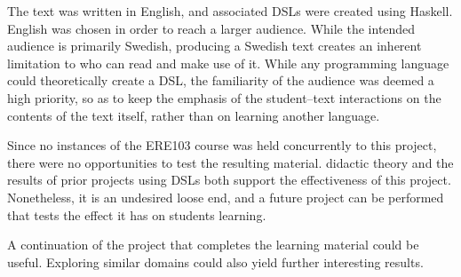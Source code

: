 The text was written in English, and associated \gls{DSL}s were created using \gls{Haskell}. 
English was chosen in order to reach a larger audience.
While the intended audience is primarily Swedish, producing a Swedish text creates an inherent limitation to who can read and make use of it. %
While any programming language could theoretically create a \gls{DSL}, the familiarity of the audience was deemed a high priority, so as to keep the emphasis of the student--text interactions on the contents of the text itself, rather than on learning another language.

Since no instances of the \gls{ERE103} course was held concurrently to this project, there were no opportunities to test the resulting material. \Gls{didactic} theory and the results of prior projects using \gls{DSL}s both support the effectiveness of this project. Nonetheless, it is an undesired loose end, and a future project can be performed that tests the effect it has on students learning. 
\begin{modtext}
A continuation of the project that completes the learning material could be useful. 
Exploring similar domains could also yield further interesting results. 
\end{modtext}
